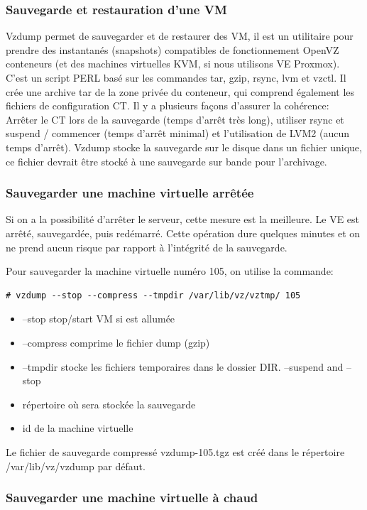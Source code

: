 \documentclass[a4paper,11pt]{report}
\begin{document}
\subsubsection{Sauvegarde et restauration d'une VM}

Vzdump permet de sauvegarder et de restaurer des VM, il est un utilitaire pour prendre des instantanés (snapshots) compatibles de fonctionnement OpenVZ conteneurs (et des machines virtuelles KVM, si nous utilisons VE Proxmox). C'est un script PERL basé sur les commandes tar, gzip, rsync, lvm et vzctl. Il crée une archive tar de la zone privée du conteneur, qui comprend également les fichiers de configuration CT. Il y a plusieurs façons d'assurer la cohérence: Arrêter le CT lors de la sauvegarde (temps d'arrêt très long), utiliser rsync et suspend / commencer (temps d'arrêt minimal) et l'utilisation de LVM2 (aucun temps d'arrêt). Vzdump stocke la sauvegarde sur le disque dans un fichier unique, ce fichier devrait être stocké à une sauvegarde sur bande pour l'archivage.


\subsubsection{Sauvegarder une machine virtuelle arrêtée}


Si on a la possibilité d'arrêter le serveur, cette mesure est la meilleure. Le VE est arrêté, sauvegardée, puis redémarré. Cette opération dure quelques minutes et on ne prend aucun risque par rapport à l'intégrité de la sauvegarde.

Pour sauvegarder la machine virtuelle numéro 105, on utilise la commande:
\begin{lstlisting}
# vzdump --stop --compress --tmpdir /var/lib/vz/vztmp/ 105
\end{lstlisting}
\begin{itemize} 
   \item --stop stop/start VM si est allumée
   \item --compress comprime le fichier dump (gzip)
   \item --tmpdir stocke les fichiers temporaires dans le dossier DIR.  --suspend and --stop
   \item répertoire où sera stockée la sauvegarde
   \item id de la machine virtuelle
\end{itemize}
Le fichier de sauvegarde compressé vzdump-105.tgz est créé dans le répertoire /var/lib/vz/vzdump par défaut.

\subsubsection{Sauvegarder une machine virtuelle à chaud}
\end{document}
